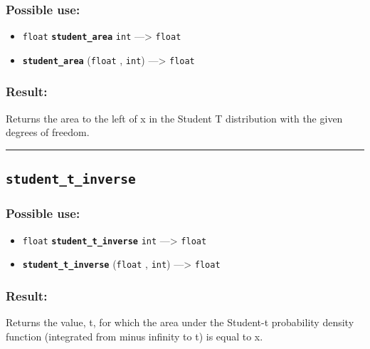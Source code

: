 \documentclass[]{book}
\providecommand{\tightlist}{%
  \setlength{\itemsep}{0pt}\setlength{\parskip}{0pt}}
\theoremstyle{definition}
\theoremstyle{definition}
\theoremstyle{definition}
\theoremstyle{remark}
\begin{document}
\subsubsection{Possible use:}\label{possible-use-506}

\begin{itemize}
\tightlist
\item
  \texttt{float} \textbf{\texttt{student\_area}} \texttt{int}
  ---\textgreater{} \texttt{float}
\item
  \textbf{\texttt{student\_area}} (\texttt{float} , \texttt{int})
  ---\textgreater{} \texttt{float}
\end{itemize}

\subsubsection{Result:}\label{result-489}

Returns the area to the left of x in the Student T distribution with the
given degrees of freedom.

\begin{center}\rule{0.5\linewidth}{\linethickness}\end{center}

\subsection{\texorpdfstring{\texttt{student\_t\_inverse}}{student\_t\_inverse}}\label{student_t_inverse}

\subsubsection{Possible use:}\label{possible-use-507}

\begin{itemize}
\tightlist
\item
  \texttt{float} \textbf{\texttt{student\_t\_inverse}} \texttt{int}
  ---\textgreater{} \texttt{float}
\item
  \textbf{\texttt{student\_t\_inverse}} (\texttt{float} , \texttt{int})
  ---\textgreater{} \texttt{float}
\end{itemize}

\subsubsection{Result:}\label{result-490}

Returns the value, t, for which the area under the Student-t probability
density function (integrated from minus infinity to t) is equal to x.
\end{document}
